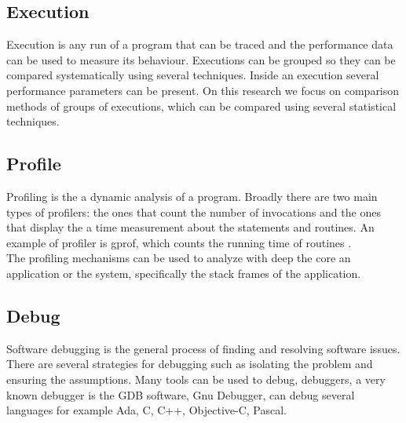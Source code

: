 \subsection{Execution}
        
Execution is any run of a program that can be traced and the performance data can be used to measure its behaviour. Executions can be grouped so they can be compared systematically using several techniques. Inside an execution several performance parameters can be present. On this research we focus on comparison methods of groups of executions, which can be compared using several statistical techniques. 

\subsection{Profile}
Profiling is the a dynamic analysis of a program. Broadly there are two main types of profilers: the ones that count the number of invocations and the ones that display the a time measurement about the statements and routines. An example of profiler is gprof, which counts the running time of routines \cite{Graham82gprofa}.\\
The profiling mechanisms can be used to analyze with deep the core an application or the system, specifically the stack frames of the application.

\subsection{Debug}
Software debugging is the general process of finding and resolving software issues. There are several strategies for debugging such as isolating the problem and ensuring the assumptions. Many tools can be used to debug, debuggers, a very known debugger is the GDB software, Gnu Debugger, can debug several languages for example Ada, C, C++, Objective-C, Pascal.\\

